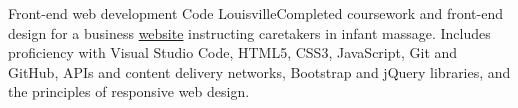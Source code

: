 {Front-end web development}{}{}
{Code Louisville}{Completed coursework and front-end design for a business \href{https://github.com/jacobarchambault/im-project}{website}  instructing caretakers in infant massage. Includes proficiency with Visual Studio Code, HTML5, CSS3, JavaScript, Git and GitHub, APIs and content delivery networks, Bootstrap and jQuery libraries, and the principles of responsive web design.}
